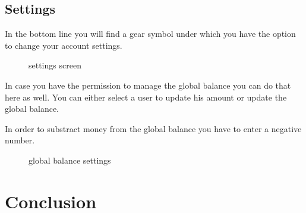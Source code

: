 \subsection{Settings}\label{settings-2}

In the bottom line you will find a gear symbol under which you have the
option to change your account settings.

\begin{figure}[htbp]
\centering
{}
\caption{settings screen}
\end{figure}

In case you have the permission to manage the global balance you can do
that here as well. You can either select a user to update his amount or
update the global balance.

In order to substract money from the global balance you have to enter a
negative number.

\begin{figure}[htbp]
\centering
{}
\caption{global balance settings}
\end{figure}

\newpage
\section{Conclusion}\label{conclusion}

